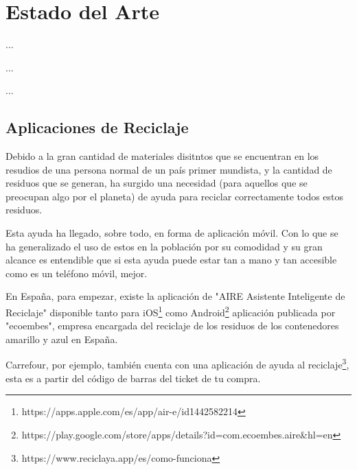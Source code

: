 %
%

\chapter{Estado del Arte}

\begin{FraseCelebre}
\begin{Frase}
...
\end{Frase}
\begin{Fuente}
...
\end{Fuente}
\end{FraseCelebre}

\begin{resumen}
...
\end{resumen}


\section{Aplicaciones de Reciclaje}
\label{cap2:sec:aplicaciones-reciclaje}

Debido a la gran cantidad de materiales disitntos que se encuentran en los resudios de una persona normal de un país primer mundista, y la cantidad de residuos que se generan, ha surgido una necesidad (para aquellos que se preocupan algo por el planeta) de ayuda para reciclar correctamente todos estos residuos. 

Esta ayuda ha llegado, sobre todo, en forma de aplicación móvil. Con lo que se ha generalizado el uso de estos en la población por su comodidad y su gran alcance es entendible que si esta ayuda puede estar tan a mano y tan accesible como es un teléfono móvil, mejor. 

En España, para empezar, existe la aplicación de "AIRE Asistente Inteligente de Reciclaje" disponible tanto para iOS\footnote{https://apps.apple.com/es/app/air-e/id1442582214} como Android\footnote{https://play.google.com/store/apps/details?id=com.ecoembes.aire&hl=en} aplicación publicada por "ecoembes", empresa encargada del reciclaje de los residuos de los contenedores amarillo y azul en España. 

Carrefour, por ejemplo, también cuenta con una aplicación de ayuda al reciclaje\footnote{https://www.reciclaya.app/es/como-funciona}, esta es a partir del código de barras del ticket de tu compra.



